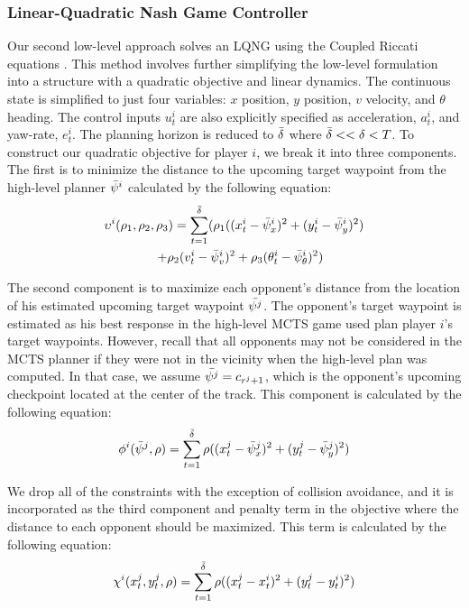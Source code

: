 \subsubsection{Linear-Quadratic Nash Game Controller}
Our second low-level approach solves an LQNG using the Coupled Riccati equations \cite{basar}. This method involves further simplifying the low-level formulation into a structure with a quadratic objective and linear dynamics. The continuous state is simplified to just four variables: $x$ position, $y$ position, $v$ velocity, and $\theta$ heading. The control inputs $u^i_t$ are also explicitly specified as acceleration, $a^i_t$, and yaw-rate, $e^i_t$. The planning horizon is reduced to $\Bar{\delta}$ where $\Bar{\delta} << \delta < T$. To construct our quadratic objective for player $i$, we break it into three components. The first is to minimize the distance to the upcoming target waypoint from the high-level planner $\Bar{\psi}^i$ calculated by the following equation:
\begin{multline} \label{eq:lqng_obj1}
\upsilon^i(\rho_1, \rho_2,\rho_3) =  \sum_{t = 1}^{\Bar{\delta}} (\rho_1((x^i_{t} - \Bar{\psi}^i_x)^2 + (y^i_{t} - \Bar{\psi}^i_y)^2) \\   \quad + \rho_2 (v^i_{t} - \Bar{\psi}^i_v)^2 
 + \rho_3 (\theta^i_{t} - \Bar{\psi}^i_\theta)^2)
\end{multline}

The second component is to maximize each opponent's distance from the location of his estimated upcoming target waypoint $\Bar{\psi^j}$. The opponent's target waypoint is estimated as his best response in the high-level MCTS game used plan player $i$'s target waypoints. However, recall that all opponents may not be considered in the MCTS planner if they were not in the vicinity when the high-level plan was computed. In that case, we assume $\Bar{\psi^j} = c_{r^j + 1}$, which is the opponent's upcoming checkpoint located at the center of the track. This component is calculated by the following equation:
\begin{equation} \label{eq:lqng_obj2}
    \phi^i(\Bar{\psi}^j, \rho) = \sum_{t = 1}^{\Bar{\delta}} \rho((x^j_{t} - \Bar{\psi}^j_x)^2 + (y^j_{t} - \Bar{\psi}^j_y)^2)
\end{equation}

We drop all of the constraints with the exception of collision avoidance, and it is incorporated as the third component and penalty term in the objective where the distance to each opponent should be maximized. This term is calculated by the following equation:
\begin{equation} \label{eq:lqng_obj3}
    \chi^i(x^j_t, y^j_t, \rho) = \sum_{t = 1}^{\Bar{\delta}} \rho((x^j_{t} - x^i_{t})^2 + (y^j_{t} - y^i_{t})^2)
\end{equation}

